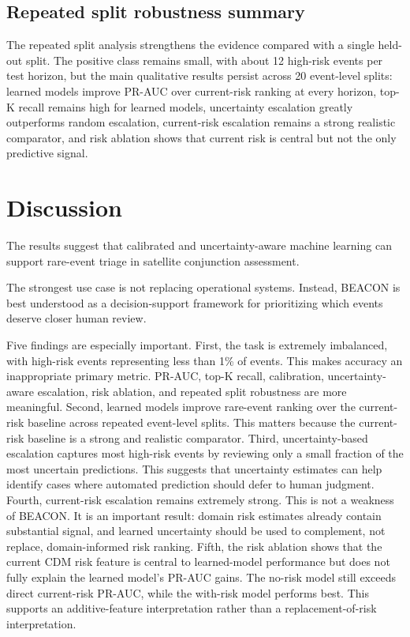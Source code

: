 \documentclass[11pt]{article}
\begin{document}
\FloatBarrier

\subsection{Repeated split robustness summary}

The repeated split analysis strengthens the evidence compared with a single held-out split. The positive class remains small, with about 12 high-risk events per test horizon, but the main qualitative results persist across 20 event-level splits: learned models improve PR-AUC over current-risk ranking at every horizon, top-K recall remains high for learned models, uncertainty escalation greatly outperforms random escalation, current-risk escalation remains a strong realistic comparator, and risk ablation shows that current risk is central but not the only predictive signal.

\section{Discussion}

The results suggest that calibrated and uncertainty-aware machine learning can support rare-event triage in satellite conjunction assessment.

The strongest use case is not replacing operational systems. Instead, BEACON is best understood as a decision-support framework for prioritizing which events deserve closer human review.

Five findings are especially important. First, the task is extremely imbalanced, with high-risk events representing less than 1\% of events. This makes accuracy an inappropriate primary metric. PR-AUC, top-K recall, calibration, uncertainty-aware escalation, risk ablation, and repeated split robustness are more meaningful. Second, learned models improve rare-event ranking over the current-risk baseline across repeated event-level splits. This matters because the current-risk baseline is a strong and realistic comparator. Third, uncertainty-based escalation captures most high-risk events by reviewing only a small fraction of the most uncertain predictions. This suggests that uncertainty estimates can help identify cases where automated prediction should defer to human judgment. Fourth, current-risk escalation remains extremely strong. This is not a weakness of BEACON. It is an important result: domain risk estimates already contain substantial signal, and learned uncertainty should be used to complement, not replace, domain-informed risk ranking. Fifth, the risk ablation shows that the current CDM risk feature is central to learned-model performance but does not fully explain the learned model's PR-AUC gains. The no-risk model still exceeds direct current-risk PR-AUC, while the with-risk model performs best. This supports an additive-feature interpretation rather than a replacement-of-risk interpretation.
\end{document}
